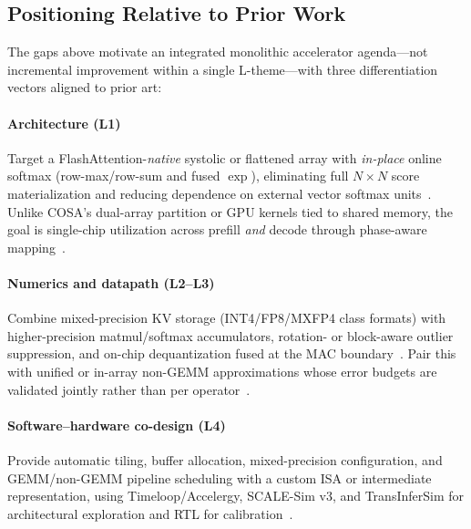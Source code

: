 \documentclass[conference]{IEEEtran}
\begin{document}
\subsection{Positioning Relative to Prior Work}
\label{sec:gaps-positioning}

The gaps above motivate an integrated monolithic accelerator agenda---not incremental improvement within a single L-theme---with three differentiation vectors aligned to prior art:

\paragraph{Architecture (L1)}
Target a FlashAttention-\emph{native} systolic or flattened array with \emph{in-place} online softmax (row-max/row-sum and fused $\exp$), eliminating full $N \times N$ score materialization and reducing dependence on external vector softmax units~\cite{lin2025systolicattention,wang2023cosa,desa2025}.
Unlike COSA's dual-array partition or GPU kernels tied to shared memory, the goal is single-chip utilization across prefill \emph{and} decode through phase-aware mapping~\cite{plena2025,streamattention2025}.

\paragraph{Numerics and datapath (L2--L3)}
Combine mixed-precision KV storage (INT4/FP8/MXFP4 class formats) with higher-precision matmul/softmax accumulators, rotation- or block-aware outlier suppression, and on-chip dequantization fused at the MAC boundary~\cite{sawint42026,batquant2026,liu2024kivi,ashkboos2024quarot}.
Pair this with unified or in-array non-GEMM approximations whose error budgets are validated jointly rather than per operator~\cite{mive2026,sole2025,guaranteednorm2026,koca2023exp}.

\paragraph{Software--hardware co-design (L4)}
Provide automatic tiling, buffer allocation, mixed-precision configuration, and GEMM/non-GEMM pipeline scheduling with a custom ISA or intermediate representation, using Timeloop/Accelergy, SCALE-Sim v3, and TransInferSim for architectural exploration and RTL for calibration~\cite{parashar2019timeloop,wu2019accelergy,scalesimv3_2025,klhufek2025transinfersim,plena2025}.
\end{document}
